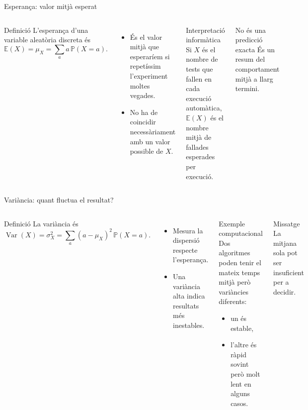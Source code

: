 \documentclass[10pt,aspectratio=169]{beamer}
\newcommand{\Prob}{\mathbb{P}}
\newcommand{\E}{\mathbb{E}}
\newcommand{\Var}{\operatorname{Var}}
\begin{document}
\begin{frame}{Esperança: valor mitjà esperat}
\begin{columns}[T]
\begin{block}{Definició}
L'esperança d'una variable aleatòria discreta és
\[
\E(X)=\mu_X=\sum_a a\,\Prob(X=a).
\]
\end{block}
\begin{itemize}
  \item És el valor mitjà que esperaríem si repetíssim l'experiment moltes vegades.
  \item No ha de coincidir necessàriament amb un valor possible de $X$.
\end{itemize}
\begin{block}{Interpretació informàtica}
Si $X$ és el nombre de tests que fallen en cada execució automàtica, $\E(X)$ és el nombre mitjà de fallades esperades per execució.
\end{block}
\begin{alertblock}{No és una predicció exacta}
És un resum del comportament mitjà a llarg termini.
\end{alertblock}
\end{columns}
\end{frame}

\begin{frame}{Variància: quant fluctua el resultat?}
\begin{columns}[T]
\begin{block}{Definició}
La variància és
\[
\Var(X)=\sigma_X^2=\sum_a (a-\mu_X)^2\,\Prob(X=a).
\]
\end{block}
\begin{itemize}
  \item Mesura la dispersió respecte l'esperança.
  \item Una variància alta indica resultats més inestables.
\end{itemize}
\begin{block}{Exemple computacional}
Dos algoritmes poden tenir el mateix temps mitjà però variàncies diferents:
\begin{itemize}
  \item un és estable,
  \item l'altre és ràpid sovint però molt lent en alguns casos.
\end{itemize}
\end{block}
\begin{alertblock}{Missatge}
La mitjana sola pot ser insuficient per a decidir.
\end{alertblock}
\end{columns}
\end{frame}
\end{document}
